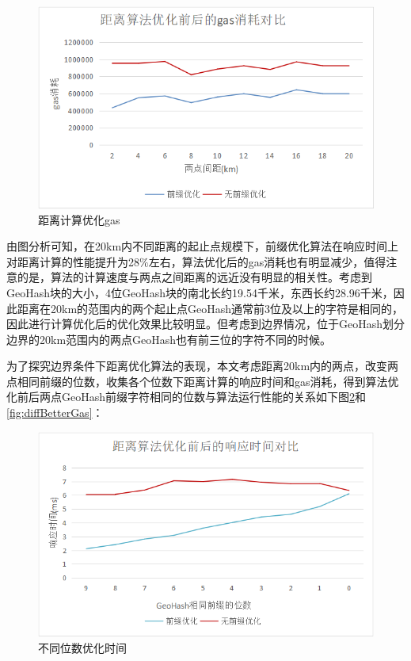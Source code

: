\begin{figure}
  \centering
  \includegraphics[width=1.0\textwidth]{figures/距离计算优化gas}
  \caption{距离计算优化gas}\label{fig:betterGas}
\end{figure}

由图分析可知，在20km内不同距离的起止点规模下，前缀优化算法在响应时间上对距离计算的性能提升为28$\%$左右，算法优化后的gas消耗也有明显减少，值得注意的是，算法的计算速度与两点之间距离的远近没有明显的相关性。考虑到GeoHash块的大小，4位GeoHash块的南北长约19.54千米，东西长约28.96千米，因此距离在20km的范围内的两个起止点GeoHash通常前3位及以上的字符是相同的，因此进行计算优化后的优化效果比较明显。但考虑到边界情况，位于GeoHash划分边界的20km范围内的两点GeoHash也有前三位的字符不同的时候。

为了探究边界条件下距离优化算法的表现，本文考虑距离20km内的两点，改变两点相同前缀的位数，收集各个位数下距离计算的响应时间和gas消耗，得到算法优化前后两点GeoHash前缀字符相同的位数与算法运行性能的关系如下图\ref{fig:diffBetterTime}和\ref{fig:diffBetterGas}：

\begin{figure}
  \centering
  \includegraphics[width=1.0\textwidth]{figures/不同位数优化时间}
  \caption{不同位数优化时间}\label{fig:diffBetterTime}
\end{figure}

